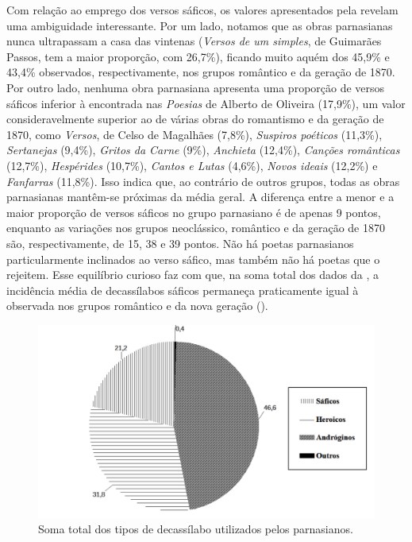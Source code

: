 \documentclass[portuguese]{textolivre}
\begin{document}
Com relação ao emprego dos versos sáficos, os valores apresentados pela  revelam uma ambiguidade interessante. Por um lado, notamos que as obras parnasianas nunca ultrapassam a casa das vintenas (\textit{Versos de um simples}, de Guimarães Passos, tem a maior proporção, com 26,7\%), ficando muito aquém dos 45,9\% e 43,4\% observados, respectivamente, nos grupos romântico e da geração de 1870. Por outro lado, nenhuma obra parnasiana apresenta uma proporção de versos sáficos inferior à encontrada nas \textit{Poesias} de Alberto de Oliveira (17,9\%), um valor consideravelmente superior ao de várias obras do romantismo e da geração de 1870, como \textit{Versos}, de Celso de Magalhães (7,8\%), \textit{Suspiros poéticos} (11,3\%), \textit{Sertanejas} (9,4\%), \textit{Gritos da Carne} (9\%), \textit{Anchieta} (12,4\%), \textit{Canções românticas} (12,7\%), \textit{Hespérides} (10,7\%),\textit{ Cantos e Lutas} (4,6\%), \textit{Novos ideais} (12,2\%) e \textit{Fanfarras} (11,8\%). Isso indica que, ao contrário de outros grupos, todas as obras parnasianas mantêm-se próximas da média geral. A diferença entre a menor e a maior proporção de versos sáficos no grupo parnasiano é de apenas 9 pontos, enquanto as variações nos grupos neoclássico, romântico e da geração de 1870 são, respectivamente, de 15, 38 e 39 pontos. Não há poetas parnasianos particularmente inclinados ao verso sáfico, mas também não há poetas que o rejeitem. Esse equilíbrio curioso faz com que, na soma total dos dados da , a incidência média de decassílabos sáficos permaneça praticamente igual à observada nos grupos romântico e da nova geração ().

\begin{figure}[!h]
    \centering
    \begin{minipage}{0.75\linewidth}
    \includegraphics[width=\linewidth]{fig-005.pdf}
    \caption{Soma total dos tipos de decassílabo utilizados pelos parnasianos.}
    \label{fig5}
    \end{minipage}
\end{figure}
\end{document}
